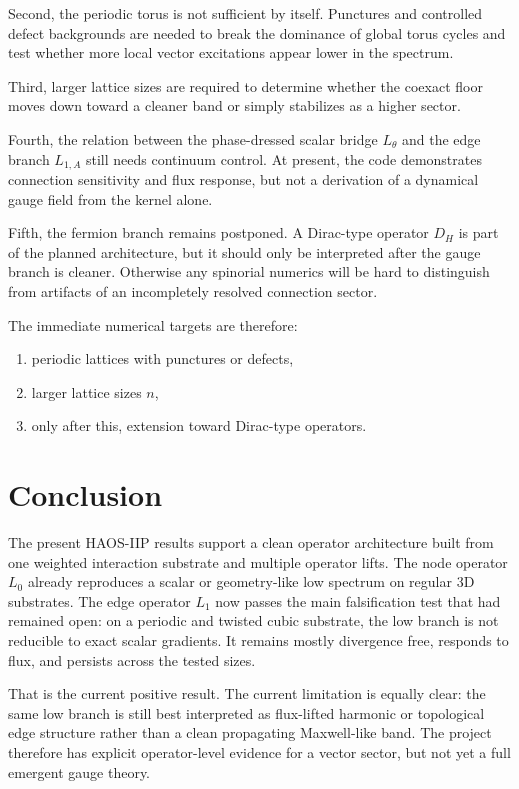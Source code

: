 \documentclass[11pt]{article}
\begin{document}
Second, the periodic torus is not sufficient by itself. Punctures and controlled defect backgrounds are needed to break the dominance of global torus cycles and test whether more local vector excitations appear lower in the spectrum.

Third, larger lattice sizes are required to determine whether the coexact floor moves down toward a cleaner band or simply stabilizes as a higher sector.

Fourth, the relation between the phase-dressed scalar bridge $L_\theta$ and the edge branch $L_{1,A}$ still needs continuum control. At present, the code demonstrates connection sensitivity and flux response, but not a derivation of a dynamical gauge field from the kernel alone.

Fifth, the fermion branch remains postponed. A Dirac-type operator $D_H$ is part of the planned architecture, but it should only be interpreted after the gauge branch is cleaner. Otherwise any spinorial numerics will be hard to distinguish from artifacts of an incompletely resolved connection sector.

The immediate numerical targets are therefore:
\begin{enumerate}
\item periodic lattices with punctures or defects,
\item larger lattice sizes $n$,
\item only after this, extension toward Dirac-type operators.
\end{enumerate}

\section{Conclusion}
The present HAOS-IIP results support a clean operator architecture built from one weighted interaction substrate and multiple operator lifts. The node operator $L_0$ already reproduces a scalar or geometry-like low spectrum on regular $3$D substrates. The edge operator $L_1$ now passes the main falsification test that had remained open: on a periodic and twisted cubic substrate, the low branch is not reducible to exact scalar gradients. It remains mostly divergence free, responds to flux, and persists across the tested sizes.

That is the current positive result. The current limitation is equally clear: the same low branch is still best interpreted as flux-lifted harmonic or topological edge structure rather than a clean propagating Maxwell-like band. The project therefore has explicit operator-level evidence for a vector sector, but not yet a full emergent gauge theory.
\end{document}
